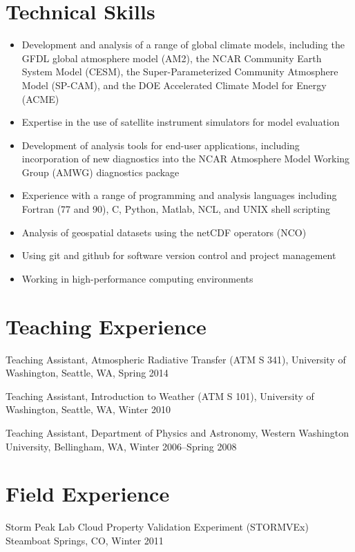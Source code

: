 \documentclass[10pt]{article}
\newenvironment{itemize*}{
   \begin{list}{}
      { 
         \setlength{\itemsep}{5pt}
         \setlength{\parsep}{0pt}
         \setlength{\topsep}{0pt}
         \setlength{\leftmargin}{0em} 
      } 
} {
   \end{list}
}
\begin{document}
\section*{Technical Skills}
\begin{itemize}
\item Development and analysis of a range of global climate models, including the GFDL global atmosphere model (AM2), the NCAR Community Earth System Model (CESM), the Super-Parameterized Community Atmosphere Model (SP-CAM), and the DOE Accelerated Climate Model for Energy (ACME)
\item Expertise in the use of satellite instrument simulators for model evaluation
\item Development of analysis tools for end-user applications, including incorporation of new diagnostics into the NCAR Atmosphere Model Working Group (AMWG) diagnostics package
\item Experience with a range of programming and analysis languages including Fortran (77 and 90), C, Python, Matlab, NCL, and UNIX shell scripting
\item Analysis of geospatial datasets using the netCDF operators (NCO)
\item Using git and github for software version control and project management
\item Working in high-performance computing environments
\end{itemize}

\section*{Teaching Experience}
\begin{itemize*}
\item
   Teaching Assistant,
   Atmospheric Radiative Transfer (ATM S 341),
   University of Washington, Seattle, WA,
   Spring 2014
\item 
   Teaching Assistant,
   Introduction to Weather (ATM S 101),
   University of Washington, Seattle, WA,
   Winter 2010
\item
   Teaching Assistant,
   Department of Physics and Astronomy,
   Western Washington University, Bellingham, WA,
   Winter 2006--Spring 2008
\end{itemize*}

\section*{Field Experience}
\begin{itemize*}
   \item Storm Peak Lab Cloud Property Validation Experiment (STORMVEx)
    Steamboat Springs, CO,
    Winter 2011
\end{itemize*}
\end{document}
